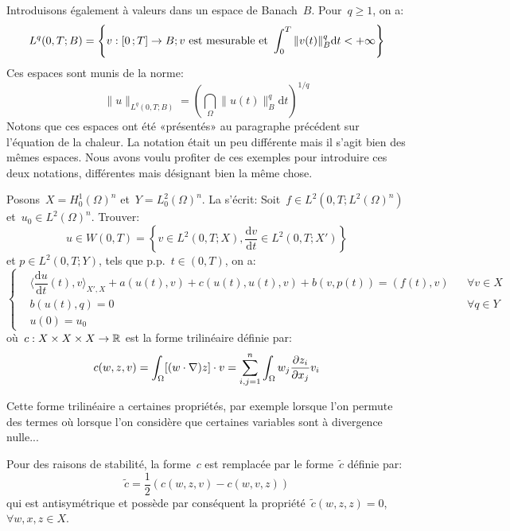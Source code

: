 \medskip
Introduisons également  à valeurs dans un espace
de Banach~$B$. Pour~$q\ge1$, on a:
\begin{equation}
L^q(0,T;B) =\left\{ v: \mathopen{[}0\,;T\mathclose{]}\rightarrow B; v \text{ est mesurable et }
\displaystyle\int_0^T \|v(t)\|^q_B \mathrm dt<+\infty\right\}
\end{equation}
Ces espaces sont munis de la norme:
\begin{equation}
\|u\|_{L^q(0,T;B)} = \left(\dint_\Omega\|u(t)\|^q_B \mathrm dt\right)^{1/q}
\end{equation}
Notons que ces espaces ont été «présentés» au paragraphe précédent sur l'équation de la chaleur. La notation était un peu différente mais il s'agit bien des mêmes espaces. Nous avons voulu profiter de ces exemples pour introduire ces deux notations, différentes mais désignant bien la même chose.

\medskip
Posons~$X=H^1_0(\Omega)^n$ et~$Y=L^2_0(\Omega)^n$.
\medskip
La  s'écrit: Soit~$f\in L^2(0,T;L^2(\Omega)^n)$ et~$u_0\in L^2(\Omega)^n$.
Trouver:
\begin{equation}u\in W(0,T)=\left\{v\in L^2(0,T;X), \dfrac{\mathrm dv}{\mathrm dt}\in L^2(0,T;X') \right\}\end{equation} et
$p\in L^2(0,T;Y)$, tels que p.p.~$t\in(0,T)$, on a:
\begin{equation}\left\{
\begin{aligned}
&\langle\dfrac{\mathrm du}{\mathrm dt}(t),v\rangle_{X',X}+a(u(t),v)+c(u(t),u(t),v)+b(v,p(t)) = (f(t),v) &&
\forall v\in X\\
&b(u(t),q) =0 &&\forall q \in Y\\
&u(0)=u_0
\end{aligned}\right.
\end{equation}
où~$c: X\times X\times X\rightarrow\mathbb R$ est la forme trilinéaire définie par:
\begin{equation}
c(w,z,v) = \dint_\Omega [(w\cdot\nabla)z]\cdot v %
=\dsum_{i,j=1}^n \dint_\Omega w_j\dfrac{\partial z_i}{\partial x_j} v_i %
\end{equation}

\medskip
Cette forme trilinéaire a certaines propriétés, par exemple lorsque l'on permute des termes où lorsque l'on considère que certaines variables sont à divergence nulle...

\medskip
Pour des raisons de stabilité, la forme~$c$ est remplacée par le forme~$\tilde{c}$ définie par:
\begin{equation}
\tilde{c} = \dfrac12 \left(c(w,z,v)-c(w,v,z)\right)
\end{equation}
qui est antisymétrique et possède par conséquent la propriété~$\tilde{c}(w,z,z)=0$,
$\forall w,x,z \in X$.

